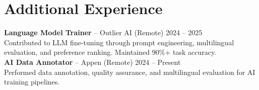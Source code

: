 \documentclass[a4paper,10pt]{article}
\begin{document}
\section{Additional Experience}
\textbf{Language Model Trainer} -- Outlier AI (Remote) \hfill 2024 -- 2025\\
Contributed to LLM fine-tuning through prompt engineering, multilingual evaluation, and preference ranking. Maintained 90\%+ task accuracy.\\[3pt]
\textbf{AI Data Annotator} -- Appen (Remote) \hfill 2024 -- Present\\
Performed data annotation, quality assurance, and multilingual evaluation for AI training pipelines.
\end{document}
